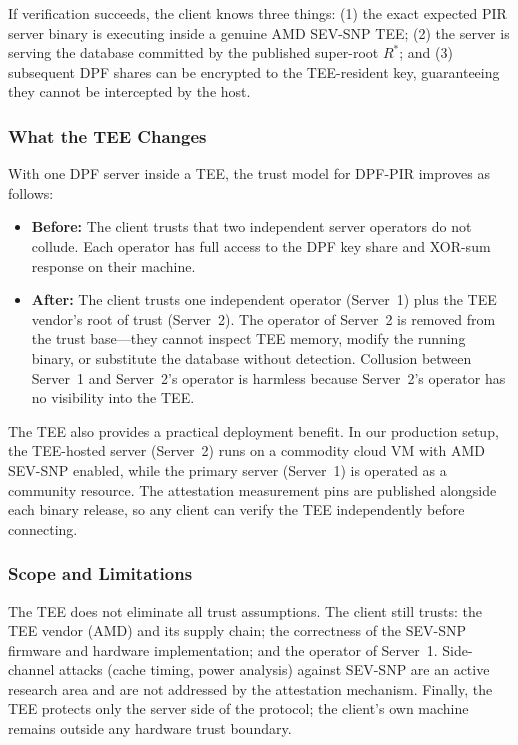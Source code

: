 If verification succeeds, the client knows three things: (1) the exact expected PIR server binary is executing inside a genuine AMD SEV-SNP TEE; (2) the server is serving the database committed by the published super-root $R^*$; and (3) subsequent DPF shares can be encrypted to the TEE-resident key, guaranteeing they cannot be intercepted by the host.

\subsubsection{What the TEE Changes}

With one DPF server inside a TEE, the trust model for DPF-PIR improves as follows:

\begin{itemize}[nolistsep,leftmargin=*]
    \item \textbf{Before:} The client trusts that two independent server operators do not collude. Each operator has full access to the DPF key share and XOR-sum response on their machine.
    \item \textbf{After:} The client trusts one independent operator (Server~1) plus the TEE vendor's root of trust (Server~2). The operator of Server~2 is removed from the trust base---they cannot inspect TEE memory, modify the running binary, or substitute the database without detection. Collusion between Server~1 and Server~2's operator is harmless because Server~2's operator has no visibility into the TEE.
\end{itemize}

The TEE also provides a practical deployment benefit. In our production setup, the TEE-hosted server (Server~2) runs on a commodity cloud VM with AMD SEV-SNP enabled, while the primary server (Server~1) is operated as a community resource. The attestation measurement pins are published alongside each binary release, so any client can verify the TEE independently before connecting.

\subsubsection{Scope and Limitations}

The TEE does not eliminate all trust assumptions. The client still trusts: the TEE vendor (AMD) and its supply chain; the correctness of the SEV-SNP firmware and hardware implementation; and the operator of Server~1. Side-channel attacks (cache timing, power analysis) against SEV-SNP are an active research area and are not addressed by the attestation mechanism. Finally, the TEE protects only the server side of the protocol; the client's own machine remains outside any hardware trust boundary.

